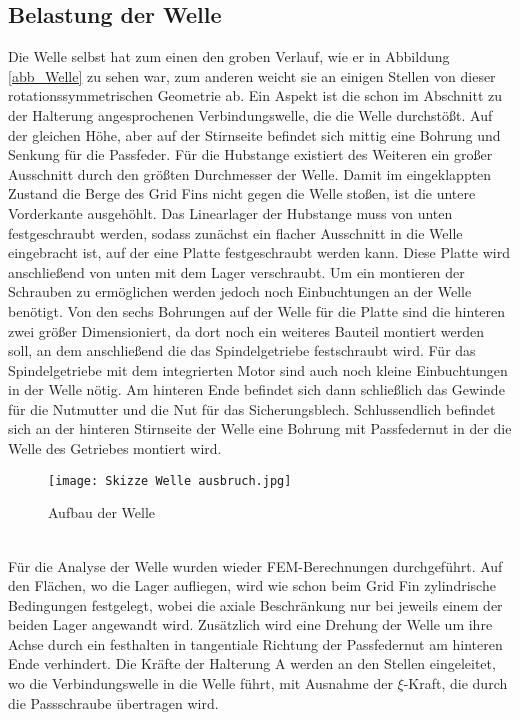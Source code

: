 \subsection{Belastung der Welle}
Die Welle selbst hat zum einen den groben Verlauf, wie er in Abbildung \ref{abb_Welle} zu sehen war, zum anderen weicht sie an einigen Stellen von dieser rotationssymmetrischen Geometrie ab. Ein Aspekt ist die schon im Abschnitt zu der Halterung angesprochenen Verbindungswelle, die die Welle durchstößt. Auf der gleichen Höhe, aber auf der Stirnseite befindet sich mittig eine Bohrung und Senkung für die Passfeder. Für die Hubstange existiert des Weiteren ein großer Ausschnitt durch den größten Durchmesser der Welle. Damit im eingeklappten Zustand die Berge des Grid Fins nicht gegen die Welle stoßen, ist die untere Vorderkante ausgehöhlt. Das Linearlager der Hubstange muss von unten festgeschraubt werden, sodass zunächst ein flacher Ausschnitt in die Welle eingebracht ist, auf der eine Platte festgeschraubt werden kann. Diese Platte wird anschließend von unten mit dem Lager verschraubt. Um ein montieren der Schrauben zu ermöglichen werden jedoch noch Einbuchtungen an der Welle benötigt. Von den sechs Bohrungen auf der Welle für die Platte sind die hinteren zwei größer Dimensioniert, da dort noch ein weiteres Bauteil montiert werden soll, an dem anschließend die das Spindelgetriebe festschraubt wird.
Für das Spindelgetriebe mit dem integrierten Motor sind auch noch kleine Einbuchtungen in der Welle nötig. Am hinteren Ende befindet sich dann schließlich das Gewinde für die Nutmutter und die Nut für das Sicherungsblech. Schlussendlich befindet sich an der hinteren Stirnseite der Welle eine Bohrung mit Passfedernut in der die Welle des Getriebes montiert wird.
\begin{figure}[h] 
	\centering
	\texttt{[image: Skizze Welle ausbruch.jpg]}
	\caption{Aufbau der Welle}
\end{figure}\\
Für die Analyse der Welle wurden wieder FEM-Berechnungen durchgeführt. Auf den Flächen, wo die Lager aufliegen, wird wie schon beim Grid Fin zylindrische Bedingungen festgelegt, wobei die axiale Beschränkung nur bei jeweils einem der beiden Lager angewandt wird. Zusätzlich wird eine Drehung der Welle um ihre Achse durch ein festhalten in tangentiale Richtung der Passfedernut am hinteren Ende verhindert.
Die Kräfte der Halterung A werden an den Stellen eingeleitet, wo die Verbindungswelle in die Welle führt, mit Ausnahme der $\xi$-Kraft, die durch die Passschraube übertragen wird. 
